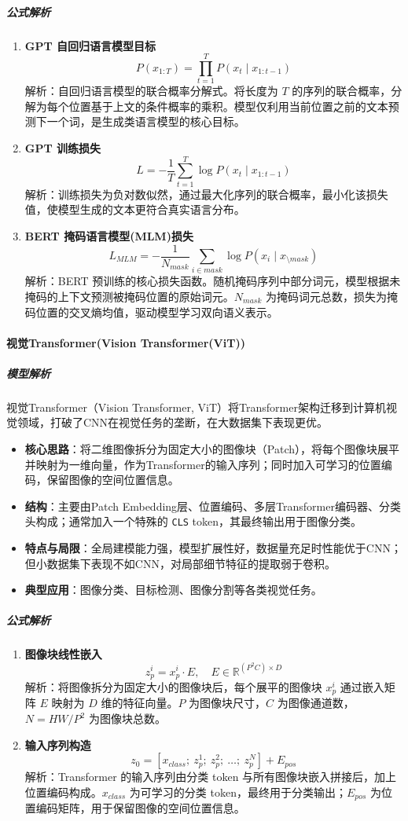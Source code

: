 \documentclass[12pt]{article}
\begin{document}
\subparagraph{公式解析}
\begin{enumerate}
    \item \textbf{GPT 自回归语言模型目标}
    \[
    P(x_{1:T}) = \prod_{t=1}^T P(x_t \mid x_{1:t-1})
    \]
    解析：自回归语言模型的联合概率分解式。将长度为 $T$ 的序列的联合概率，分解为每个位置基于上文的条件概率的乘积。模型仅利用当前位置之前的文本预测下一个词，是生成类语言模型的核心目标。

    \item \textbf{GPT 训练损失}
    \[
    L = -\frac{1}{T} \sum_{t=1}^T \log P(x_t \mid x_{1:t-1})
    \]
    解析：训练损失为负对数似然，通过最大化序列的联合概率，最小化该损失值，使模型生成的文本更符合真实语言分布。

    \item \textbf{BERT 掩码语言模型(MLM)损失}
    \[
    L_{MLM} = -\frac{1}{N_{mask}} \sum_{i \in mask} \log P(x_i \mid x_{\setminus mask})
    \]
    解析：BERT 预训练的核心损失函数。随机掩码序列中部分词元，模型根据未掩码的上下文预测被掩码位置的原始词元。$N_{mask}$ 为掩码词元总数，损失为掩码位置的交叉熵均值，驱动模型学习双向语义表示。
\end{enumerate}

\paragraph{视觉Transformer(Vision Transformer(ViT))}
\subparagraph{模型解析}
视觉Transformer（Vision Transformer, ViT）将Transformer架构迁移到计算机视觉领域，打破了CNN在视觉任务的垄断，在大数据集下表现更优。
\begin{itemize}
    \item \textbf{核心思路}：将二维图像拆分为固定大小的图像块（Patch），将每个图像块展平并映射为一维向量，作为Transformer的输入序列；同时加入可学习的位置编码，保留图像的空间位置信息。
    \item \textbf{结构}：主要由Patch Embedding层、位置编码、多层Transformer编码器、分类头构成；通常加入一个特殊的 \texttt{CLS} token，其最终输出用于图像分类。
    \item \textbf{特点与局限}：全局建模能力强，模型扩展性好，数据量充足时性能优于CNN；但小数据集下表现不如CNN，对局部细节特征的提取弱于卷积。
    \item \textbf{典型应用}：图像分类、目标检测、图像分割等各类视觉任务。
\end{itemize}

\subparagraph{公式解析}
\begin{enumerate}
    \item \textbf{图像块线性嵌入}
    \[
    z_p^i = x_p^i \cdot E,\quad E \in \mathbb{R}^{(P^2 C) \times D}
    \]
    解析：将图像拆分为固定大小的图像块后，每个展平的图像块 $x_p^i$ 通过嵌入矩阵 $E$ 映射为 $D$ 维的特征向量。$P$ 为图像块尺寸，$C$ 为图像通道数，$N=HW/P^2$ 为图像块总数。

    \item \textbf{输入序列构造}
    \[
    z_0 = \left[ x_{class};\ z_p^1;\ z_p^2;\ \dots;\ z_p^N \right] + E_{pos}
    \]
    解析：Transformer 的输入序列由分类 token 与所有图像块嵌入拼接后，加上位置编码构成。$x_{class}$ 为可学习的分类 token，最终用于分类输出；$E_{pos}$ 为位置编码矩阵，用于保留图像的空间位置信息。
\end{enumerate}
\end{document}
